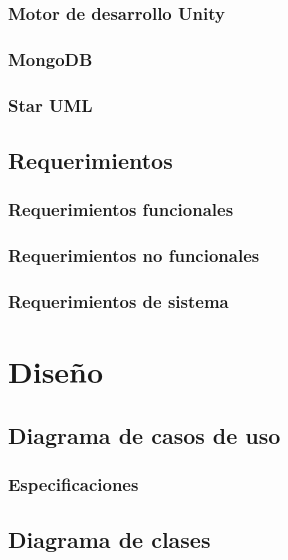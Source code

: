 \documentclass[12pt,twoside]{article}
\begin{document}
	\subsubsection{Motor de desarrollo Unity}
	
	\subsubsection{MongoDB}
	
	\subsubsection{Star UML}
	
	\subsection{Requerimientos}
	
	\subsubsection{Requerimientos funcionales}
	
	\subsubsection{Requerimientos no funcionales}
	
	\subsubsection{Requerimientos de sistema}

	\section{Diseño}
	
	\subsection{Diagrama de casos de uso}
	
	\subsubsection{Especificaciones}
	
	\subsection{Diagrama de clases}
\end{document}
